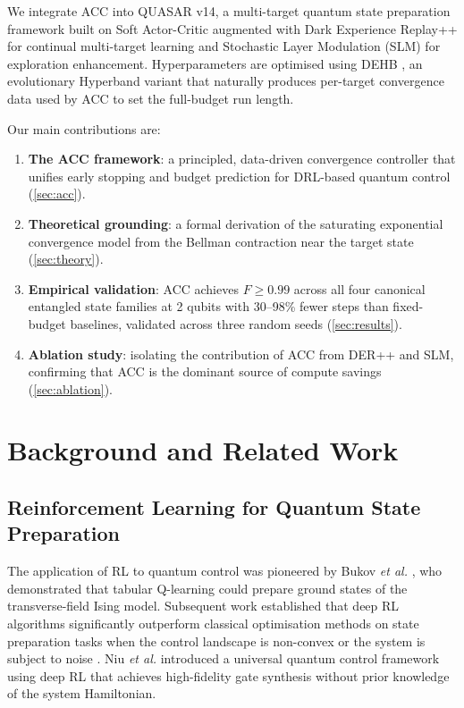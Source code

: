 \documentclass[twocolumn,superscriptaddress]{quantumarticle}
\begin{document}
We integrate ACC into QUASAR v14, a multi-target quantum state preparation framework
built on Soft Actor-Critic \cite{haarnoja2018soft} augmented with Dark Experience
Replay++ \cite{buzzega2020dark} for continual multi-target learning and Stochastic
Layer Modulation (SLM) for exploration enhancement. Hyperparameters are optimised
using DEHB \cite{awad2021dehb}, an evolutionary Hyperband variant that naturally
produces per-target convergence data used by ACC to set the full-budget run length.

Our main contributions are:
\begin{enumerate}
  \item \textbf{The ACC framework}: a principled, data-driven convergence controller
    that unifies early stopping and budget prediction for DRL-based quantum control
    (\cref{sec:acc}).
  \item \textbf{Theoretical grounding}: a formal derivation of the saturating exponential
    convergence model from the Bellman contraction near the target state
    (\cref{sec:theory}).
  \item \textbf{Empirical validation}: ACC achieves $F \geq 0.99$ across all four
    canonical entangled state families at 2 qubits with 30--98\% fewer steps than
    fixed-budget baselines, validated across three random seeds
    (\cref{sec:results}).
  \item \textbf{Ablation study}: isolating the contribution of ACC from DER++ and SLM,
    confirming that ACC is the dominant source of compute savings
    (\cref{sec:ablation}).
\end{enumerate}

\section{Background and Related Work}
\label{sec:related}

\subsection{Reinforcement Learning for Quantum State Preparation}

The application of RL to quantum control was pioneered by Bukov \emph{et al.}
\cite{bukov2018reinforcement}, who demonstrated that tabular Q-learning could prepare
ground states of the transverse-field Ising model. Subsequent work established that
deep RL algorithms significantly outperform classical optimisation methods on state
preparation tasks when the control landscape is non-convex or the system is subject
to noise \cite{zhang2019does}. Niu \emph{et al.} \cite{niu2019universal} introduced
a universal quantum control framework using deep RL that achieves high-fidelity gate
synthesis without prior knowledge of the system Hamiltonian.
\end{document}
